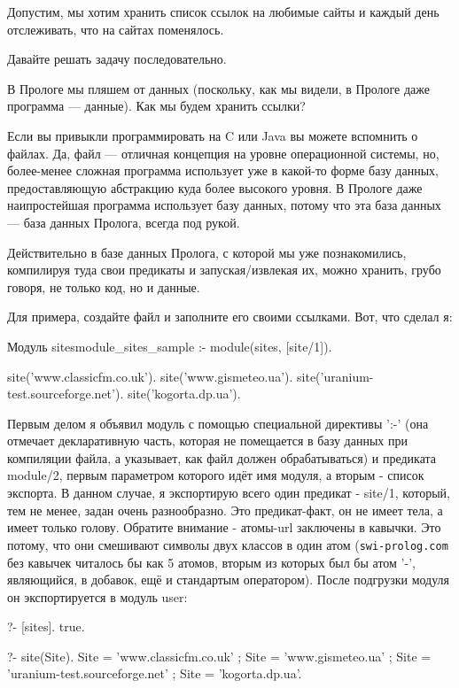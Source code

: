 \documentclass[a4paper]{book}
\begin{document}
Допустим, мы хотим хранить список ссылок на любимые сайты и
каждый день отслеживать, что на сайтах поменялось.

Давайте решать задачу последовательно.

В Прологе мы пляшем от данных (поскольку, как мы видели, в
Прологе даже программа --- данные). Как мы будем хранить ссылки?

Если вы привыкли программировать на C или Java вы можете
вспомнить о файлах. Да, файл --- отличная концепция на уровне
операционной системы, но, более-менее сложная программа
использует уже в какой-то форме базу данных, предоставляющую
абстракцию куда более высокого уровня. В Прологе даже
наипростейшая программа использует базу данных, потому что эта
база данных --- база данных Пролога, всегда под рукой.

Действительно в базе данных Пролога, с которой мы уже
познакомились, компилируя туда свои предикаты и запуская/извлекая
их, можно хранить, грубо говоря, не только код, но и данные.

Для примера, создайте файл и заполните его своими ссылками. Вот,
что сделал я:

\begin{example}{Модуль sites}{module_sites_sample}
:- module(sites, [site/1]).

site('www.classicfm.co.uk').
site('www.gismeteo.ua').
site('uranium-test.sourceforge.net').
site('kogorta.dp.ua').
\end{example}

Первым делом я объявил модуль с помощью специальной директивы
':-' (она отмечает декларативную часть, которая не помещается в
базу данных при компиляции файла, а указывает, как файл должен
обрабатываться) и предиката module/2, первым параметром которого
идёт имя модуля, а вторым - список экспорта. В данном случае, я
экспортирую всего один предикат - site/1, который, тем не менее,
задан очень разнообразно. Это предикат-факт, он не имеет тела, а
имеет только голову. Обратите внимание - атомы-url заключены в
кавычки. Это потому, что они смешивают символы двух классов в
один атом (\verb|swi-prolog.com| без кавычек читалось бы как 5
атомов, вторым из которых был бы атом '-', являющийся, в добавок,
ещё и стандартым оператором). После подгрузки модуля он
экспортируется в модуль user:    

\begin{example}{}{}
?- [sites].
true.

?- site(Site).
Site = 'www.classicfm.co.uk' ;
Site = 'www.gismeteo.ua' ;
Site = 'uranium-test.sourceforge.net' ;
Site = 'kogorta.dp.ua'.
\end{example}
\end{document}
